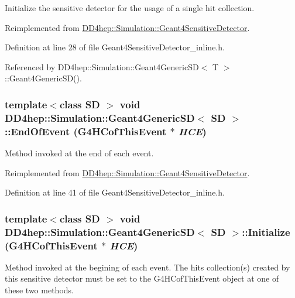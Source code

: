 Initialize the sensitive detector for the usage of a single hit collection. 

Reimplemented from \hyperlink{class_d_d4hep_1_1_simulation_1_1_geant4_sensitive_detector_ad66e6523db65dab402beb511e438c2c9}{DD4hep::Simulation::Geant4SensitiveDetector}.

Definition at line 28 of file Geant4SensitiveDetector\_\-inline.h.

Referenced by DD4hep::Simulation::Geant4GenericSD$<$ T $>$::Geant4GenericSD().\hypertarget{class_d_d4hep_1_1_simulation_1_1_geant4_generic_s_d_a07009f3334d1f7125c128cc59fc20e6e}{
\subsubsection[{EndOfEvent}]{\setlength{\rightskip}{0pt plus 5cm}template$<$class SD $>$ void {\bf DD4hep::Simulation::Geant4GenericSD}$<$ SD $>$::EndOfEvent (G4HCofThisEvent $\ast$ {\em HCE})}}
\label{class_d_d4hep_1_1_simulation_1_1_geant4_generic_s_d_a07009f3334d1f7125c128cc59fc20e6e}


Method invoked at the end of each event. 

Reimplemented from \hyperlink{class_d_d4hep_1_1_simulation_1_1_geant4_sensitive_detector_a1275a33abdbd4efb70ee1698eda3d2db}{DD4hep::Simulation::Geant4SensitiveDetector}.

Definition at line 41 of file Geant4SensitiveDetector\_\-inline.h.\hypertarget{class_d_d4hep_1_1_simulation_1_1_geant4_generic_s_d_a1e65440bc948eb7ba84792fcfdd002ed}{
\subsubsection[{Initialize}]{\setlength{\rightskip}{0pt plus 5cm}template$<$class SD $>$ void {\bf DD4hep::Simulation::Geant4GenericSD}$<$ SD $>$::Initialize (G4HCofThisEvent $\ast$ {\em HCE})}}
\label{class_d_d4hep_1_1_simulation_1_1_geant4_generic_s_d_a1e65440bc948eb7ba84792fcfdd002ed}
Method invoked at the begining of each event. The hits collection(s) created by this sensitive detector must be set to the G4HCofThisEvent object at one of these two methods. 

